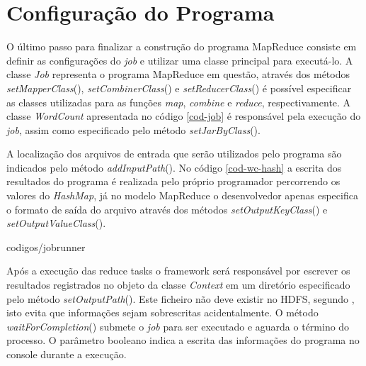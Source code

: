 \section{Configuração do Programa}

O último passo para finalizar a construção do programa MapReduce consiste em definir as configurações do \textit{job} e utilizar uma classe principal para executá-lo. A classe \textit{Job} representa o programa MapReduce em questão, através dos métodos \textit{setMapperClass}(), \textit{setCombinerClass}() e \textit{setReducerClass}() é possível especificar as classes utilizadas para as funções \textit{map}, \textit{combine} e \textit{reduce}, respectivamente. A classe \textit{WordCount} apresentada no código \ref{cod-job} é responsável pela execução do \textit{job}, assim como especificado pelo método \textit{setJarByClass}().

A localização dos arquivos de entrada que serão utilizados pelo programa são indicados pelo método \textit{addInputPath}(). No código \ref{cod-wc-hash} a escrita dos resultados do programa é realizada pelo próprio programador percorrendo os valores do \textit{HashMap}, já no modelo MapReduce o desenvolvedor apenas especifica o formato de saída do arquivo através dos métodos \textit{setOutputKeyClass}() e \textit{setOutputValueClass}().


		{codigos/jobrunner}

Após a execução das reduce tasks o framework será responsável por escrever os resultados registrados no objeto da classe \textit{Context} em um diretório  especificado pelo método \textit{setOutputPath}(). Este ficheiro não deve existir no HDFS, segundo , isto evita que informações sejam sobrescritas acidentalmente. O método \textit{waitForCompletion}() submete o \textit{job} para ser executado e aguarda o término do processo. O parâmetro booleano indica a escrita das informações do programa no console durante a execução.




